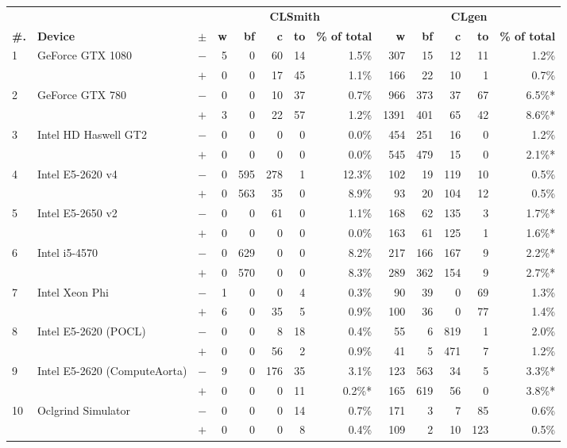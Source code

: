   \begin{tabular}{lll | rrrrr | rrrrr }
  \toprule
  & & & \multicolumn{5}{c|}{\textbf{CLSmith}} & \multicolumn{5}{c}{\textbf{CLgen}} \\
  \textbf{\#.} & \textbf{Device} & $\pm$ &
  \textbf{w} & \textbf{bf} & \textbf{c} & \textbf{to} & \textbf{\% of total} &
  \textbf{w} & \textbf{bf} & \textbf{c} & \textbf{to} & \textbf{\% of total} \\
  \midrule
  \multirow{ 2}{*}{1} & \multirow{ 2}{*}{GeForce GTX 1080} & $-$ & 5 & 0 & 60 & 14 & 1.5\%       & 307 & 15 & 12 & 11 & 1.2\% \\& & $+$ & 0 & 0 & 17 & 45 & 1.1\% & 166 & 22 & 10 & 1 & 0.7\% \\
\hline
\multirow{ 2}{*}{2} & \multirow{ 2}{*}{GeForce GTX 780} & $-$ & 0 & 0 & 10 & 37 & 0.7\%       & 966 & 373 & 37 & 67 & 6.5\%* \\& & $+$ & 3 & 0 & 22 & 57 & 1.2\% & 1391 & 401 & 65 & 42 & 8.6\%* \\
\hline
\multirow{ 2}{*}{3} & \multirow{ 2}{*}{Intel HD Haswell GT2} & $-$ & 0 & 0 & 0 & 0 & 0.0\%       & 454 & 251 & 16 & 0 & 1.2\% \\& & $+$ & 0 & 0 & 0 & 0 & 0.0\% & 545 & 479 & 15 & 0 & 2.1\%* \\
\hline
\multirow{ 2}{*}{4} & \multirow{ 2}{*}{Intel E5-2620 v4} & $-$ & 0 & 595 & 278 & 1 & 12.3\%       & 102 & 19 & 119 & 10 & 0.5\% \\& & $+$ & 0 & 563 & 35 & 0 & 8.9\% & 93 & 20 & 104 & 12 & 0.5\% \\
\hline
\multirow{ 2}{*}{5} & \multirow{ 2}{*}{Intel E5-2650 v2} & $-$ & 0 & 0 & 61 & 0 & 1.1\%       & 168 & 62 & 135 & 3 & 1.7\%* \\& & $+$ & 0 & 0 & 0 & 0 & 0.0\% & 163 & 61 & 125 & 1 & 1.6\%* \\
\hline
\multirow{ 2}{*}{6} & \multirow{ 2}{*}{Intel i5-4570} & $-$ & 0 & 629 & 0 & 0 & 8.2\%       & 217 & 166 & 167 & 9 & 2.2\%* \\& & $+$ & 0 & 570 & 0 & 0 & 8.3\% & 289 & 362 & 154 & 9 & 2.7\%* \\
\hline
\multirow{ 2}{*}{7} & \multirow{ 2}{*}{Intel Xeon Phi} & $-$ & 1 & 0 & 0 & 4 & 0.3\%       & 90 & 39 & 0 & 69 & 1.3\% \\& & $+$ & 6 & 0 & 35 & 5 & 0.9\% & 100 & 36 & 0 & 77 & 1.4\% \\
\hline
\multirow{ 2}{*}{8} & \multirow{ 2}{*}{Intel E5-2620 (POCL)} & $-$ & 0 & 0 & 8 & 18 & 0.4\%       & 55 & 6 & 819 & 1 & 2.0\% \\& & $+$ & 0 & 0 & 56 & 2 & 0.9\% & 41 & 5 & 471 & 7 & 1.2\% \\
\hline
\multirow{ 2}{*}{9} & \multirow{ 2}{*}{Intel E5-2620 (ComputeAorta)} & $-$ & 9 & 0 & 176 & 35 & 3.1\%       & 123 & 563 & 34 & 5 & 3.3\%* \\& & $+$ & 0 & 0 & 0 & 11 & 0.2\%* & 165 & 619 & 56 & 0 & 3.8\%* \\
\hline
\multirow{ 2}{*}{10} & \multirow{ 2}{*}{Oclgrind Simulator} & $-$ & 0 & 0 & 0 & 14 & 0.7\%       & 171 & 3 & 7 & 85 & 0.6\% \\& & $+$ & 0 & 0 & 0 & 8 & 0.4\% & 109 & 2 & 10 & 123 & 0.5\% \\
  \bottomrule
\end{tabular}

